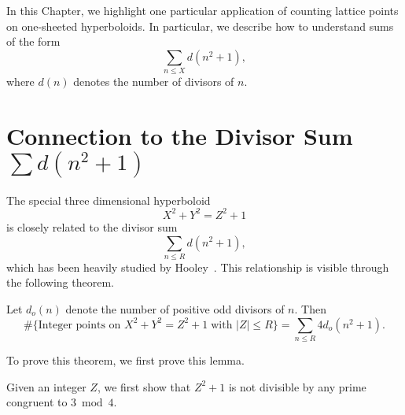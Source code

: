


In this Chapter, we highlight one particular application of counting lattice points on
one-sheeted hyperboloids.
In particular, we describe how to understand sums of the form
\begin{equation}
  \sum_{n \leq X} d (n^2 + 1),
\end{equation}
where $d(n)$ denotes the number of divisors of $n$.



\section*{Connection to the Divisor Sum $\sum d(n^2 + 1)$}


The special three dimensional hyperboloid
\begin{equation}
  X^2 + Y^2 = Z^2 + 1
\end{equation}
is closely related to the divisor sum
\begin{equation}
  \sum_{n \leq R} d(n^2 + 1),
\end{equation}
which has been heavily studied by Hooley~\cite{Hooley63}.
This relationship is visible through the following theorem.


\begin{theorem}
  Let $d_o(n)$ denote the number of positive odd divisors of $n$.
  Then
  \begin{equation}
    \#\{\text{Integer points on } X^2 + Y^2 = Z^2 + 1 \; \text{with } \lvert Z \rvert \leq
    R \} = \sum_{n \leq R} 4 d_o(n^2 + 1).
  \end{equation}
\end{theorem}



To prove this theorem, we first prove this lemma.



\begin{lemma}
  Given an integer $Z$, we first show that $Z^2 + 1$ is not divisible by any prime
  congruent to $3 \bmod 4$.
\end{lemma}


